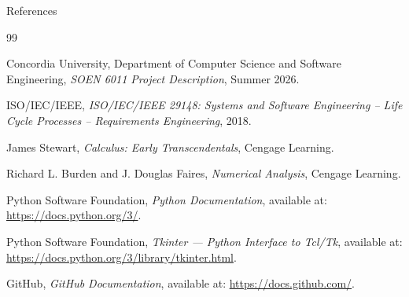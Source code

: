 \documentclass[aspectratio=169]{beamer}
\begin{document}
\begin{frame}[allowframebreaks]{References}
\footnotesize
\begin{thebibliography}{99}

Concordia University, Department of Computer Science and Software Engineering,
\emph{SOEN 6011 Project Description},
Summer 2026.

ISO/IEC/IEEE,
\emph{ISO/IEC/IEEE 29148: Systems and Software Engineering --
Life Cycle Processes -- Requirements Engineering},
2018.

James Stewart,
\emph{Calculus: Early Transcendentals},
Cengage Learning.

Richard L. Burden and J. Douglas Faires,
\emph{Numerical Analysis},
Cengage Learning.

Python Software Foundation,
\emph{Python Documentation},
available at: \url{https://docs.python.org/3/}.

Python Software Foundation,
\emph{Tkinter --- Python Interface to Tcl/Tk},
available at: \url{https://docs.python.org/3/library/tkinter.html}.

GitHub,
\emph{GitHub Documentation},
available at: \url{https://docs.github.com/}.

\end{thebibliography}
\end{frame}
\end{document}
